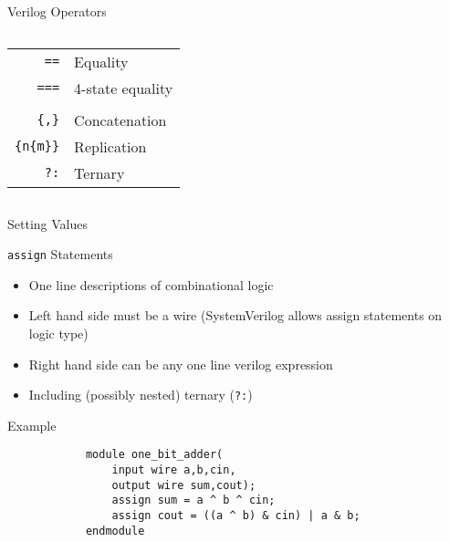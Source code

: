 \documentclass[table,dvipsnames,colorlinks=true]{beamer}
\begin{document}
\begin{frame}{Verilog Operators}
\begin{columns}
\begin{column}[T]{0.55\textwidth}
\begin{table}[h]
\begin{tabular}{rl}
                    \texttt{==} & Equality \\
                    \rowcolor{RoyalBlue!20}
                    \texttt{===} & 4-state equality \\
                     \rowcolor{RoyalBlue!50}
                    \multicolumn{2}{c}{Special} \\  
                    \rowcolor{RoyalBlue!20}
                    \texttt{\{,\}} & Concatenation \\
                    \rowcolor{RoyalBlue!20}
                    \texttt{\{n\{m\}\}} & Replication \\
                    \rowcolor{RoyalBlue!20}
                    \texttt{?:} & Ternary \\
                \end{tabular}
            \end{table}
        \end{column}
    \end{columns}
\end{frame}

\begin{frame}[fragile]{Setting Values}
    \begin{block}{\texttt{assign} Statements}
        \begin{itemize}
            \item One line descriptions of combinational logic
            \item Left hand side must be a wire (SystemVerilog allows assign statements on logic type)
            \item Right hand side can be any one line verilog expression
            \item Including (possibly nested) ternary (\texttt{?:})
        \end{itemize}
    \end{block}
    \begin{block}{Example}
        \begin{verbatim}
            module one_bit_adder(
                input wire a,b,cin,
                output wire sum,cout);
                assign sum = a ^ b ^ cin;
                assign cout = ((a ^ b) & cin) | a & b;
            endmodule
        \end{verbatim}
    \end{block}
\end{frame}
\end{document}
